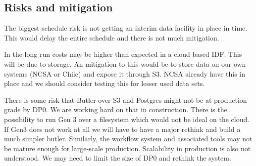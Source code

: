 \subsection{Risks and mitigation}

The biggest schedule risk is not getting an interim data facility in place in time.
This would delay the entire schedule and there is not much mitigation.

In the long run costs may be higher than expected in a cloud based IDF. This will be due to storage.
An mitigation to this would be to store data on our own systems (NCSA or Chile) and expose it through S3.
NCSA already have this in place and we should consider testing this for lesser used data sets.

There is some risk that  Butler over S3 and Postgres  might not be at  production grade by DP0. We are working hard on that in construction. There is the possibility to run Gen 3 over a filesystem which would not be ideal on the cloud. If Gen3 does not work at all we will have to have a major rethink and build a much simpler butler.
Similarly, the workflow system and associated tools may not be mature enough for large-scale production. Scalability in production is also not understood. We may need to limit the size of DP0 and rethink the system.
